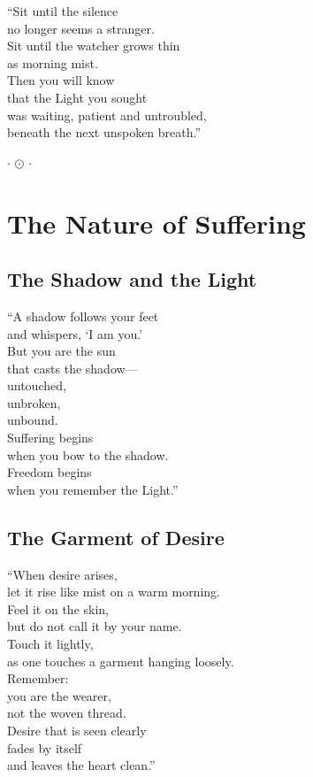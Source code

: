 \documentclass[10pt, openright]{book}
\newcommand{\sectionbreak}{\filbreak}
\newcommand{\ornament}{
    \vspace{1.5cm}
    \begin{center}
        \large \(\cdot\) \(\odot\) \(\cdot\)
    \end{center}
    \vspace{1.5cm}
}
\begin{document}
``Sit until the silence\\
no longer seems a stranger.\\
Sit until the watcher grows thin\\
as morning mist.\\
Then you will know\\
that the Light you sought\\
was waiting, patient and untroubled,\\
beneath the next unspoken breath.''

\ornament

\chapter{The Nature of Suffering}\label{the-nature-of-suffering}

\sectionbreak

\section{The Shadow and the Light}\label{the-shadow-and-the-light}

``A shadow follows your feet\\
and whispers, `I am you.'\\
But you are the sun\\
that casts the shadow---\\
untouched,\\
unbroken,\\
unbound.\\
Suffering begins\\
when you bow to the shadow.\\
Freedom begins\\
when you remember the Light.''

\sectionbreak

\section{The Garment of Desire}\label{the-garment-of-desire}

``When desire arises,\\
let it rise like mist on a warm morning.\\
Feel it on the skin,\\
but do not call it by your name.\\
Touch it lightly,\\
as one touches a garment hanging loosely.\\
Remember:\\
you are the wearer,\\
not the woven thread.\\
Desire that is seen clearly\\
fades by itself\\
and leaves the heart clean.''
\end{document}
